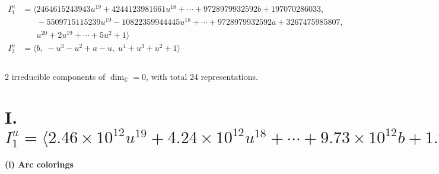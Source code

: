 \documentclass[1p]{elsarticle_modified}
\theoremstyle{definition}
\begin{document}
\begin{align*}
I^u_{1}&=\langle 
2464615243943 u^{19}+4244123981661 u^{18}+\cdots+9728979932592 b+197070286033,\\
\phantom{I^u_{1}}&\phantom{= \langle  }-5509715115239 u^{19}-10822359944445 u^{18}+\cdots+9728979932592 a+3267475985807,\\
\phantom{I^u_{1}}&\phantom{= \langle  }u^{20}+2 u^{19}+\cdots+5 u^2+1\rangle \\
I^u_{2}&=\langle 
b,\;- u^3- u^2+a- u,\;u^4+u^3+u^2+1\rangle \\
\\
\end{align*}
\raggedright * 2 irreducible components of $\dim_{\mathbb{C}}=0$, with total 24 representations.\\
\newpage
\renewcommand{\arraystretch}{1}
\centering \section*{I. $I^u_{1}= \langle 2.46\times10^{12} u^{19}+4.24\times10^{12} u^{18}+\cdots+9.73\times10^{12} b+1.97\times10^{11},\;-5.51\times10^{12} u^{19}-1.08\times10^{13} u^{18}+\cdots+9.73\times10^{12} a+3.27\times10^{12},\;u^{20}+2 u^{19}+\cdots+5 u^2+1 \rangle$}
\flushleft \textbf{(i) Arc colorings}\\
\end{document}
